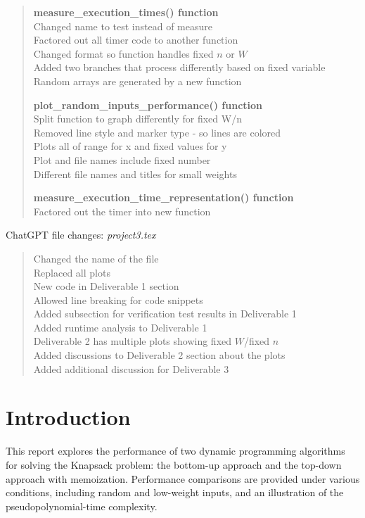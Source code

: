 \documentclass{article}
\begin{document}
\begin{quote}
\textbf{measure\_execution\_times() function}\\
Changed name to test instead of measure \\
Factored out all timer code to another function \\
Changed format so function handles fixed $n$ or $W$ \\
Added two branches that process differently based on fixed variable \\
Random arrays are generated by a new function

\textbf{plot\_random\_inputs\_performance() function}\\
Split function to graph differently for fixed W/n \\
Removed line style and marker type - so lines are colored \\
Plots all of range for x and fixed values for y \\
Plot and file names include fixed number \\
Different file names and titles for small weights

\textbf{measure\_execution\_time\_representation() function} \\
Factored out the timer into new function 

\end{quote}
ChatGPT file changes: \textit{project3.tex}

\begin{quote}
Changed the name of the file\\
Replaced all plots \\
New code in Deliverable 1 section \\
Allowed line breaking for code snippets \\
Added subsection for verification test results in Deliverable 1 \\
Added runtime analysis to Deliverable 1 \\
Deliverable 2 has multiple plots showing fixed $W$/fixed $n$ \\
Added discussions to Deliverable 2 section about the plots \\
Added additional discussion for Deliverable 3

\end{quote}

\section*{Introduction}
This report explores the performance of two dynamic programming algorithms for solving the Knapsack problem: the bottom-up approach and the top-down approach with memoization. Performance comparisons are provided under various conditions, including random and low-weight inputs, and an illustration of the pseudopolynomial-time complexity.
\end{document}
